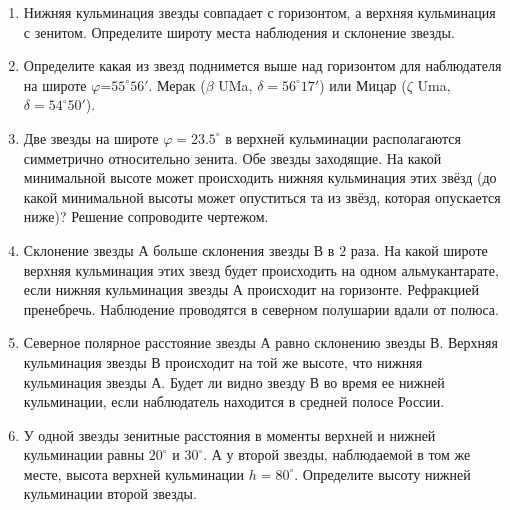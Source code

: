 \documentclass[12pt]{article}
\begin{document}
\begin{enumerate}
		\item Нижняя кульминация звезды совпадает с горизонтом, а верхняя кульминация с зенитом. Определите широту места наблюдения и склонение звезды.
		\item Определите какая из звезд поднимется выше над горизонтом для наблюдателя на широте $\varphi$=$55^{\circ}56'$. Мерак ($\beta$ UMa, $\delta=56^{\circ}17'$) или Мицар ($\zeta$ Uma, $\delta=54^{\circ}50'$).
		\item Две звезды на широте $\varphi = 23.5^{\circ}$ в верхней кульминации располагаются симметрично относительно зенита. Обе звезды заходящие. На какой минимальной высоте может происходить нижняя кульминация этих звёзд (до какой минимальной высоты может опуститься та из звёзд, которая опускается ниже)? Решение сопроводите чертежом.
		\item Склонение звезды А больше склонения звезды В в $2$ раза. На какой широте верхняя кульминация этих звезд будет происходить на одном альмукантарате, если нижняя кульминация звезды А происходит на горизонте. Рефракцией пренебречь. Наблюдение проводятся в северном полушарии вдали от полюса.
		\item Северное полярное расстояние звезды А равно склонению звезды В. Верхняя кульминация звезды В происходит на той же высоте, что нижняя кульминация звезды А. Будет ли видно звезду В во время ее нижней кульминации, если наблюдатель находится в средней полосе России. 
		\item У одной звезды зенитные расстояния в моменты верхней и нижней кульминации равны $20^{\circ}$ и $30^{\circ}$. А у второй звезды, наблюдаемой в том же месте, высота верхней кульминации $h=80^{\circ}$. Определите высоту нижней кульминации второй звезды.	
\end{enumerate}
\end{document}
